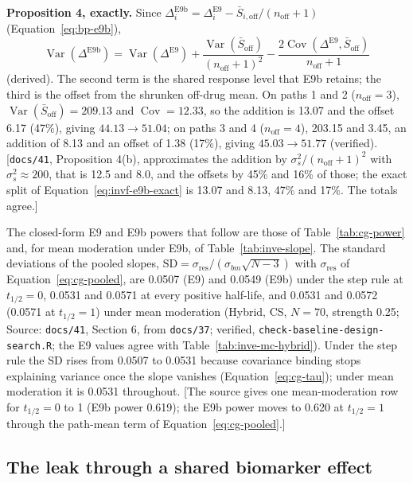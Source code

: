 \documentclass[11pt]{article}
\newcommand{\note}[1]{\textcolor{blue!60!black}{\small [#1]}}
\newcommand{\code}[1]{\texttt{#1}}
\begin{document}
\textbf{Proposition 4, exactly.} Since $\Delta_i^{\mathrm{E9b}} =
\Delta_i^{\mathrm{E9}} - \bar S_{i,\text{off}}/(n_{\text{off}}+1)$
(Equation~\eqref{eq:bp-e9b}),
\begin{equation}
\operatorname{Var}(\Delta^{\mathrm{E9b}}) = \operatorname{Var}(\Delta^{\mathrm{E9}})
  + \frac{\operatorname{Var}(\bar S_{\text{off}})}{(n_{\text{off}}+1)^2}
  - \frac{2\operatorname{Cov}(\Delta^{\mathrm{E9}}, \bar S_{\text{off}})}
         {n_{\text{off}}+1}
\label{eq:invf-e9b-exact}
\end{equation}
(derived). The second term is the shared response level that E9b retains;
the third is the offset from the shrunken off-drug mean. On paths 1 and 2
($n_{\text{off}} = 3$), $\operatorname{Var}(\bar S_{\text{off}}) =
209.13$ and $\operatorname{Cov} = 12.33$, so the addition is 13.07 and
the offset 6.17 (47\%), giving $44.13 \to 51.04$; on paths 3 and 4
($n_{\text{off}} = 4$), 203.15 and 3.45, an addition of 8.13 and an
offset of 1.38 (17\%), giving $45.03 \to 51.77$ (verified). \note{\code{docs/41},
Proposition 4(b), approximates the addition by $\sigma_s^2/(n_{\text{off}}
+ 1)^2$ with $\sigma_s^2 \approx 200$, that is 12.5 and 8.0, and the
offsets by 45\% and 16\% of those; the exact split of
Equation~\eqref{eq:invf-e9b-exact} is 13.07 and 8.13, 47\% and 17\%. The
totals agree.}

The closed-form E9 and E9b powers that follow are those of
Table~\ref{tab:cg-power} and, for mean moderation under E9b, of
Table~\ref{tab:inve-slope}. The standard deviations of the pooled
slopes, $\mathrm{SD} = \sigma_{\mathrm{res}}/(\sigma_{bm}\sqrt{N-3})$
with $\sigma_{\mathrm{res}}$ of Equation~\eqref{eq:cg-pooled}, are
0.0507 (E9) and 0.0549 (E9b) under the step rule at $t_{1/2} = 0$,
0.0531 and 0.0571 at every positive half-life, and 0.0531 and 0.0572
(0.0571 at $t_{1/2} = 1$) under mean moderation (Hybrid, CS, $N = 70$,
strength 0.25; Source: \code{docs/41}, Section 6, from \code{docs/37};
verified, \code{check-baseline-design-search.R}; the E9 values agree with
Table~\ref{tab:inve-mc-hybrid}). Under the step rule the SD rises from
0.0507 to 0.0531 because covariance binding stops explaining variance
once the slope vanishes (Equation~\eqref{eq:cg-tau}); under mean
moderation it is 0.0531 throughout. \note{The source gives one
mean-moderation row for $t_{1/2} = 0$ to 1 (E9b power 0.619); the E9b
power moves to 0.620 at $t_{1/2} = 1$ through the path-mean term of
Equation~\eqref{eq:cg-pooled}.}

\subsection{The leak through a shared biomarker effect}
\end{document}
